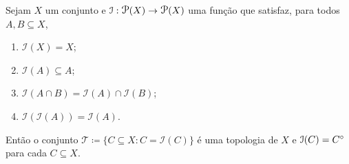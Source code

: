 \begin{prop}
	Sejam $X$ um conjunto e $\mathcal I: \p(X) \to \p(X)$ uma função que satisfaz, para todos $A,B \subseteq X$,
	\begin{enumerate}
	\item $\mathcal I(X) = X$;
	\item $\mathcal I(A) \subseteq A$;
	\item $\mathcal I(A \cap B) = \mathcal I(A) \cap \mathcal I(B)$;
	\item $\mathcal I(\mathcal I(A)) = \mathcal I(A)$.
	\end{enumerate}
	
Então o conjunto $\mathcal T \coloneqq \{C \subseteq X : C = \mathcal I(C)\}$ é uma topologia de $X$ e $\mathcal I(C) = {C}^\circ$ para cada $C \subseteq X$.
\end{prop}
